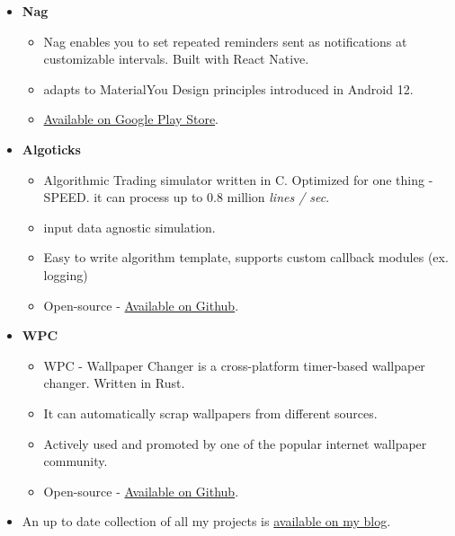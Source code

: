 \documentclass{article}
\begin{document}
\begin{itemize}
    \item \textbf{Nag}
	\subitem
	\begin{itemize}
		\vspace{-0.25cm}
		\item Nag enables you to set repeated reminders sent as notifications at customizable intervals. Built with React Native.
		\item adapts to MaterialYou Design principles introduced in Android 12.
        \item \href{https://play.google.com/store/apps/details?id=top.stdin.nag}{Available on Google Play Store}.
		\vspace{0.35cm}
\end{itemize}

\pagebreak

    \item \textbf{Algoticks}
    \subitem
    \begin{itemize}
        \vspace{-0.25cm}
        \item Algorithmic Trading simulator written in C. Optimized for one thing - SPEED. it can process up to 0.8 million \textit{lines / sec}.
        \item input data agnostic simulation.
        \item Easy to write algorithm template, supports custom callback modules (ex. logging)
        \item Open-source - \href{https://github.com/jkotra/algoticks/}{Available on Github}.
        \vspace{0.35cm}
    \end{itemize}
    
    \item \textbf{WPC}
    \subitem
    \begin{itemize}
        \vspace{-0.25cm}
        \item WPC - Wallpaper Changer is a cross-platform timer-based wallpaper changer. Written in Rust.
        \item It can automatically scrap wallpapers from different sources.
        \item Actively used and promoted by one of the popular internet wallpaper community.
        \item Open-source - \href{https://github.com/jkotra/wpc/}{Available on Github}.
        \vspace{0.35cm}
    \end{itemize}
    
    \item An up to date collection of all my projects is \href{https://stdin.top/portfolio/}{available on my blog}.                  
\end{itemize}
\end{document}
